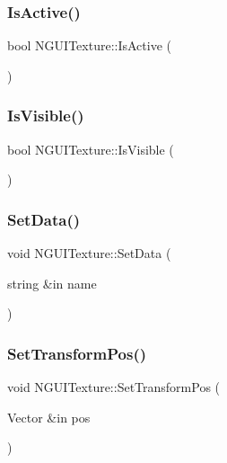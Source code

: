\subsubsection{\texorpdfstring{Is\+Active()}{IsActive()}}
{\footnotesize\ttfamily bool N\+G\+U\+I\+Texture\+::\+Is\+Active (\begin{DoxyParamCaption}{ }\end{DoxyParamCaption})}

\hypertarget{class_n_g_u_i_texture_a7f294b6e4f7633a9982123ff8613d035}{}\label{class_n_g_u_i_texture_a7f294b6e4f7633a9982123ff8613d035} 
\subsubsection{\texorpdfstring{Is\+Visible()}{IsVisible()}}
{\footnotesize\ttfamily bool N\+G\+U\+I\+Texture\+::\+Is\+Visible (\begin{DoxyParamCaption}{ }\end{DoxyParamCaption})}

\hypertarget{class_n_g_u_i_texture_af551aadd67b2803e847569aba90422fa}{}\label{class_n_g_u_i_texture_af551aadd67b2803e847569aba90422fa} 
\subsubsection{\texorpdfstring{Set\+Data()}{SetData()}}
{\footnotesize\ttfamily void N\+G\+U\+I\+Texture\+::\+Set\+Data (\begin{DoxyParamCaption}\item[{string \&in}]{name }\end{DoxyParamCaption})}

\hypertarget{class_n_g_u_i_texture_a177fbcf853afa834509e974c2ee2ed97}{}\label{class_n_g_u_i_texture_a177fbcf853afa834509e974c2ee2ed97} 
\subsubsection{\texorpdfstring{Set\+Transform\+Pos()}{SetTransformPos()}}
{\footnotesize\ttfamily void N\+G\+U\+I\+Texture\+::\+Set\+Transform\+Pos (\begin{DoxyParamCaption}\item[{Vector \&in}]{pos }\end{DoxyParamCaption})}

